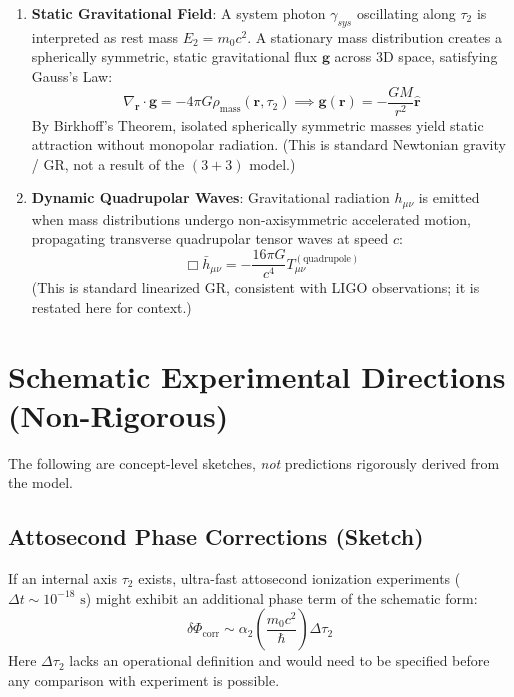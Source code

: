\documentclass[11pt,a4paper]{article}
\begin{document}
\begin{enumerate}
\item \textbf{Static Gravitational Field}: A system photon $\gamma_{sys}$ oscillating along $\tau_2$ is interpreted as rest mass $E_2 = m_0 c^2$. A stationary mass distribution creates a spherically symmetric, static gravitational flux $\mathbf{g}$ across 3D space, satisfying Gauss's Law:
\begin{equation}
\nabla_{\mathbf{r}} \cdot \mathbf{g} = -4\pi G \rho_{\text{mass}}(\mathbf{r}, \tau_2) \implies \mathbf{g}(\mathbf{r}) = -\frac{G M}{r^2} \hat{\mathbf{r}}
\end{equation}
By Birkhoff's Theorem, isolated spherically symmetric masses yield static attraction without monopolar radiation. (This is standard Newtonian gravity / GR, not a result of the $(3+3)$ model.)
\item \textbf{Dynamic Quadrupolar Waves}: Gravitational radiation $h_{\mu\nu}$ is emitted when mass distributions undergo non-axisymmetric accelerated motion, propagating transverse quadrupolar tensor waves at speed $c$:
\begin{equation}
\Box \bar{h}_{\mu\nu} = -\frac{16\pi G}{c^4} T_{\mu\nu}^{(\text{quadrupole})}
\end{equation}
(This is standard linearized GR, consistent with LIGO observations; it is restated here for context.)
\end{enumerate}

\section{Schematic Experimental Directions (Non-Rigorous)}

The following are concept-level sketches, \emph{not} predictions rigorously derived from the model.

\subsection{Attosecond Phase Corrections (Sketch)}
If an internal axis $\tau_2$ exists, ultra-fast attosecond ionization experiments ($\Delta t \sim 10^{-18}\text{ s}$) might exhibit an additional phase term of the schematic form:
\begin{equation}
\delta \Phi_{\text{corr}} \sim \alpha_2 \left( \frac{m_0 c^2}{\hbar} \right) \Delta \tau_2
\end{equation}
Here $\Delta \tau_2$ lacks an operational definition and would need to be specified before any comparison with experiment is possible.
\end{document}
